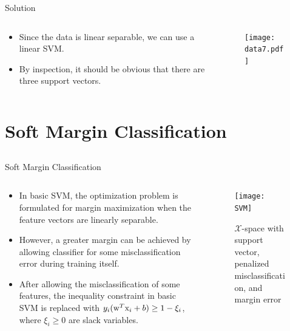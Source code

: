 \begin{frame}{Solution}
\begin{columns}
\begin{column}{7cm}
\begin{itemize}
\item Since the data is linear separable, we can use a linear SVM.
\item By inspection, it should be obvious that there are three support vectors.
\end{itemize}
\end{column}
\begin{column}{7cm}
\begin{figure}
\texttt{[image: data7.pdf]}
\end{figure}
\end{column}
\end{columns}
\end{frame}

\section{Soft Margin Classification}
\subsection{}
\begin{frame}{Soft Margin Classification}
\begin{columns}
\begin{column}{7cm}
\begin{itemize}
\item In basic SVM, the optimization problem is formulated for margin maximization when the feature vectors are linearly separable. 
\item However, a greater margin can be achieved by {\color{mycolor2}allowing classifier for some misclassification error} during training itself.
\item After allowing the misclassification of some features, the inequality constraint in basic SVM is replaced with ${y_i}({ {\rm w}^T}{\rm x}_i + b) \ge 1-\xi _i$, where $\xi _i\geq 0$ are {\color{mycolor2}slack variables}.
\end{itemize}
\end{column}
\begin{column}{7cm}
\begin{figure}[htbp]
\centering
\texttt{[image: SVM]}
\caption{$\mathcal{X}$-space with support vector, penalized misclassification, and margin error}
\end{figure}
\end{column}
\end{columns}
\end{frame}

